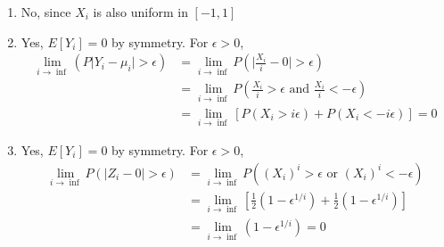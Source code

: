 \documentclass[../../probability-notes.tex]{subfile}
\begin{document}
        \begin{enumerate}
            \item No, since $X_{i}$ is also uniform in $[-1,1]$
            \item Yes, $E[Y_{i}] = 0$ by symmetry. For $\epsilon > 0$,
            \begin{align*}
                \lim_{i \to \inf}(P\vert Y_{i} - \mu_{i} \vert > \epsilon) &= \lim_{i \to \inf} P(\vert \frac{X_{i}}{i} - 0 \vert > \epsilon)\\
                &= \lim_{i \to \inf} P(\frac{X_{i}}{i} > \epsilon \text{ and } \frac{X_{i}}{i} < -\epsilon)\\
                &= \lim_{i \to \inf} [P(X_{i} > i\epsilon) + P(X_{i} < -i\epsilon)] = 0
            \end{align*}
            \item Yes, $E[Y_{i}] = 0$ by symmetry. For $\epsilon > 0$,
            \begin{align*}
                \lim_{i \to \inf}P(\vert Z_{i} - 0 \vert > \epsilon) &= \lim_{i \to \inf}P((X_{i})^{i} > \epsilon \text{ or } (X_{i})^{i} < -\epsilon)\\
                &= \lim_{i \to \inf} [\frac{1}{2}(1 - \epsilon^{1/i}) + \frac{1}{2}(1 - \epsilon^{1/i})]\\
                &= \lim_{i \to \inf}(1 - \epsilon^{1/i}) = 0
            \end{align*}
        \end{enumerate}
\end{document}
